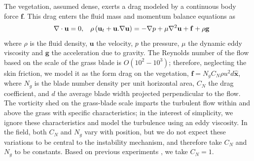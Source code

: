 \documentclass[aps,prl,twocolumn,superscriptaddress,sort&compress,10pt]{revtex4-1}  %
\newcommand{\bx}{{\boldsymbol{\hat{x}}}}
\newcommand{\bn}{{\boldsymbol{\hat{n}}}}
\newcommand{\bu}{\mathbf{u}}
\newcommand{\grad}{\mathbf{\nabla}}
\begin{document}
The vegetation, assumed dense, exerts a drag modeled by a continuous body force $\mathbf{f}$.
This drag enters the fluid mass and momentum balance equations as 
\begin{equation}
\quad \grad\cdot\bu = 0,\hspace{3mm} \rho \left(\bu_{t}+\bu.\grad\bu \right) = -\grad p+\mu\grad^{2}\bu +\mathbf{f}+\rho\mathbf{g}
\label{navier-stokes}
\end{equation}
where $\rho$ is the fluid density, $\mathbf{u}$ the velocity, 
$p$ the pressure, $\mu$ the dynamic eddy viscosity and $\mathbf{g}$ the acceleration due to gravity. 
The Reynolds number of the flow based on the scale of the grass blade is $O(10^2-10^3)$; therefore, neglecting the skin friction, we model it as the form drag on the vegetation, $\mathbf{f}=N_g C_N \rho u^{2}d\bx$, where  $N_g$ is the blade number density per unit horizontal area, $C_{N}$ the drag coefficient, and $d$ the average blade width projected perpendicular to the flow. 
The vorticity shed on the grass-blade scale imparts the turbulent flow within and above the grass with specific characteristics; in the interest of simplicity, we ignore these characteristics and model the turbulence using an eddy viscosity. 
In the field, both $C_N$ and $N_g$ vary with position, but we do not expect these variations to be central to the instability mechanism, and therefore take $C_N$ and $N_g$ to be constants. 
Based on previous experiments \cite{Vivoni98,Nepf00}, we take $C_N = 1$.
\end{document}
